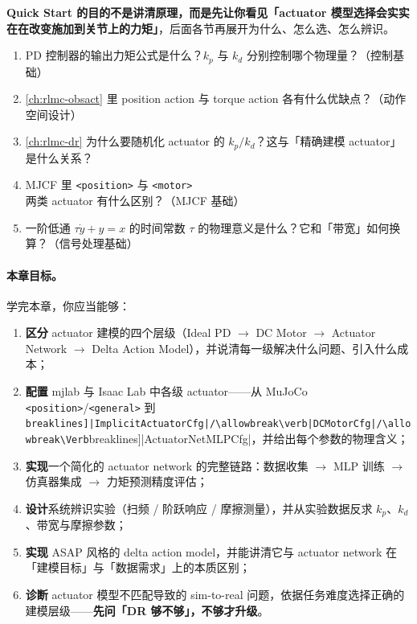\noindent\textbf{Quick Start 的目的不是讲清原理，而是先让你看见「actuator 模型选择会实实在在改变施加到关节上的力矩」}，后面各节再展开为什么、怎么选、怎么辨识。

\begin{practice}
\begin{enumerate}
  \item PD 控制器的输出力矩公式是什么？$k_p$ 与 $k_d$ 分别控制哪个物理量？（控制基础）
  \item \cref{ch:rlmc-obsact} 里 position action 与 torque action 各有什么优缺点？（动作空间设计）
  \item \cref{ch:rlmc-dr} 为什么要随机化 actuator 的 $k_p/k_d$？这与「精确建模 actuator」是什么关系？
  \item MJCF 里 \verb|<position>| 与 \verb|<motor>| 两类 actuator 有什么区别？（MJCF 基础）
  \item 一阶低通 $\tau\dot y + y = x$ 的时间常数 $\tau$ 的物理意义是什么？它和「带宽」如何换算？（信号处理基础）
\end{enumerate}
\end{practice}

\paragraph{本章目标。}学完本章，你应当能够：
\begin{enumerate}
  \item \textbf{区分} actuator 建模的四个层级（Ideal PD $\to$ DC Motor $\to$ Actuator Network $\to$ Delta Action Model），并说清每一级解决什么问题、引入什么成本；
  \item \textbf{配置} mjlab 与 Isaac Lab 中各级 actuator——从 MuJoCo \verb|<position>|/\allowbreak\verb|<general>| 到 \Verb[breaklines]|ImplicitActuatorCfg|/\allowbreak\verb|DCMotorCfg|/\allowbreak\Verb[breaklines]|ActuatorNetMLPCfg|，并给出每个参数的物理含义；
  \item \textbf{实现}一个简化的 actuator network 的完整链路：数据收集 $\to$ MLP 训练 $\to$ 仿真器集成 $\to$ 力矩预测精度评估；
  \item \textbf{设计}系统辨识实验（扫频 / 阶跃响应 / 摩擦测量），并从实验数据反求 $k_p$、$k_d$、带宽与摩擦参数；
  \item \textbf{实现} ASAP 风格的 delta action model，并能讲清它与 actuator network 在「建模目标」与「数据需求」上的本质区别；
  \item \textbf{诊断} actuator 模型不匹配导致的 sim-to-real 问题，依据任务难度选择正确的建模层级——\textbf{先问「DR 够不够」，不够才升级}。
\end{enumerate}


